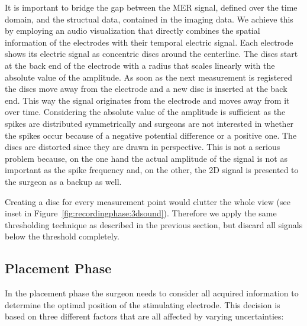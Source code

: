 \documentclass{vgtc}                          %
\begin{document}
It is important to bridge the gap between the MER signal, defined over the time domain, and the structual data, contained in the imaging data. We achieve this by employing an audio visualization that directly combines the spatial information of the electrodes with their temporal electric signal. Each electrode shows its electric signal as concentric discs around the centerline. The discs start at the back end of the electrode with a radius that scales linearly with the absolute value of the amplitude. As soon as the next measurement is registered the discs move away from the electrode and a new disc is inserted at the back end. This way the signal originates from the electrode and moves away from it over time. Considering the absolute value of the amplitude is sufficient as the spikes are distributed symmetrically and surgeons are not interested in whether the spikes occur because of a negative potential difference or a positive one. The discs are distorted since they are drawn in perspective. This is not a serious problem because, on the one hand the actual amplitude of the signal is not as important as the spike frequency and, on the other, the 2D signal is presented to the surgeon as a backup as well.

Creating a disc for every measurement point would clutter the whole view (see inset in Figure~\ref{fig:recordingphase:3dsound}). Therefore we apply the same thresholding technique as described in the previous section, but discard all signals below the threshold completely.


\subsection{Placement Phase}\label{sec:overview:placement}
In the placement phase the surgeon needs to consider all acquired information to determine the optimal position of the stimulating electrode. This decision is based on three different factors that are all affected by varying uncertainties:
\end{document}
